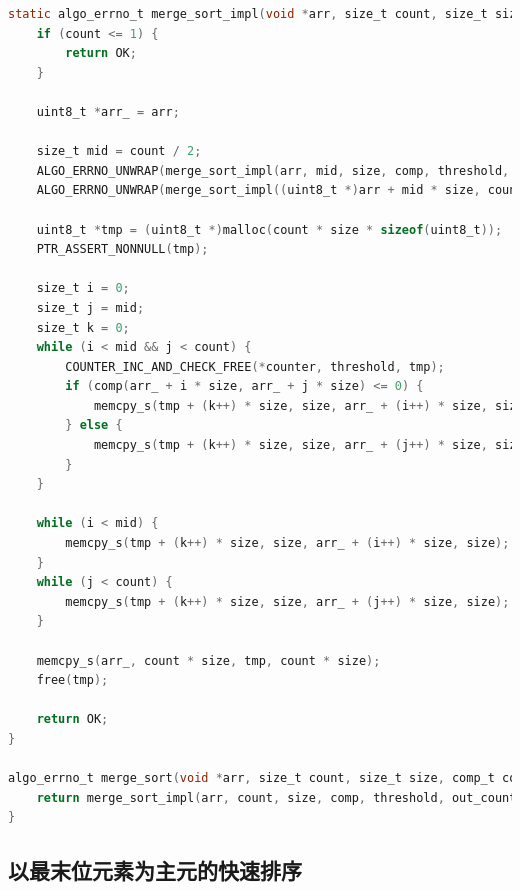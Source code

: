 \documentclass[12pt]{article}
\begin{document}
\begin{lstlisting}[language=C]
static algo_errno_t merge_sort_impl(void *arr, size_t count, size_t size, comp_t comp, uint64_t threshold, uint64_t *counter) {
    if (count <= 1) {
        return OK;
    }

    uint8_t *arr_ = arr;

    size_t mid = count / 2;
    ALGO_ERRNO_UNWRAP(merge_sort_impl(arr, mid, size, comp, threshold, counter));
    ALGO_ERRNO_UNWRAP(merge_sort_impl((uint8_t *)arr + mid * size, count - mid, size, comp, threshold, counter));

    uint8_t *tmp = (uint8_t *)malloc(count * size * sizeof(uint8_t));
    PTR_ASSERT_NONNULL(tmp);

    size_t i = 0;
    size_t j = mid;
    size_t k = 0;
    while (i < mid && j < count) {
        COUNTER_INC_AND_CHECK_FREE(*counter, threshold, tmp);
        if (comp(arr_ + i * size, arr_ + j * size) <= 0) {
            memcpy_s(tmp + (k++) * size, size, arr_ + (i++) * size, size);
        } else {
            memcpy_s(tmp + (k++) * size, size, arr_ + (j++) * size, size);
        }
    }

    while (i < mid) {
        memcpy_s(tmp + (k++) * size, size, arr_ + (i++) * size, size);
    }
    while (j < count) {
        memcpy_s(tmp + (k++) * size, size, arr_ + (j++) * size, size);
    }

    memcpy_s(arr_, count * size, tmp, count * size);
    free(tmp);

    return OK;
}

algo_errno_t merge_sort(void *arr, size_t count, size_t size, comp_t comp, uint64_t threshold, uint64_t *out_counter) {
    return merge_sort_impl(arr, count, size, comp, threshold, out_counter);
}
\end{lstlisting}

\subsection{以最末位元素为主元的快速排序}
\end{document}
